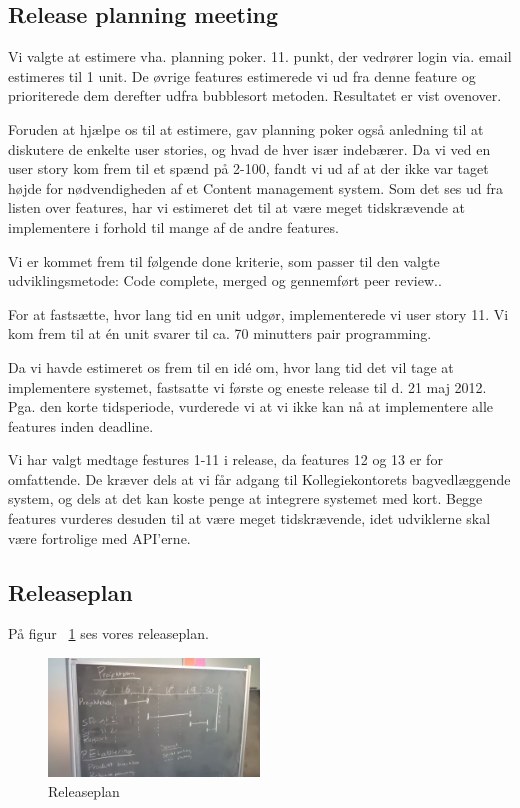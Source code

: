 \documentclass[12pt, a4paper]{report}
\begin{document}
\subsection{Release planning meeting}

Vi valgte at estimere vha. planning poker. 11. punkt, der vedrører login via. email estimeres til 1 unit. De øvrige features estimerede vi  ud fra denne feature og prioriterede dem derefter udfra bubblesort metoden. Resultatet er vist ovenover.

Foruden at hjælpe os til at estimere, gav planning poker også anledning til at diskutere de enkelte user stories, og hvad de hver især indebærer. Da vi ved en user story kom frem til et spænd på 2-100, fandt vi ud af at der ikke var taget højde for nødvendigheden af et Content management system. Som det ses ud fra listen over features, har vi estimeret det til at være meget tidskrævende at implementere i forhold til mange af de andre features.

Vi er kommet frem til følgende done kriterie, som passer til den valgte udviklingsmetode: Code complete, merged og gennemført peer review..

For at fastsætte, hvor lang tid en unit udgør, implementerede vi user story 11. Vi kom frem til at én unit svarer til ca. 70 minutters pair programming.

Da vi havde estimeret os frem til en idé om, hvor lang tid det vil tage at implementere systemet, fastsatte vi første og eneste release til d. 21 maj 2012. Pga. den korte tidsperiode, vurderede vi at vi ikke kan nå at implementere alle features inden deadline.

Vi har valgt medtage festures 1-11 i release, da features 12 og 13 er for omfattende. De kræver dels at vi får adgang til Kollegiekontorets bagvedlæggende system, og dels at det kan koste penge at integrere systemet med kort. Begge features vurderes desuden til at være meget tidskrævende, idet udviklerne skal være fortrolige med API’erne.

\subsection{Releaseplan}
På figur ~\ref{release_plan} ses vores releaseplan.
\begin{figure}
\includegraphics[width=0.5\textwidth]{releaseplan}
\caption{Releaseplan}
\label{release_plan}
\end{figure}
\end{document}
